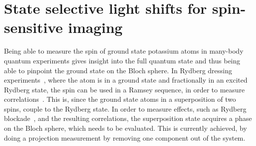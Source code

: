 \chapter{State selective light shifts for spin-sensitive imaging}%
\label{ch:spin_resolved}


Being able to measure the spin of ground state potassium atoms in many-body quantum experiments gives insight into the full quantum state and thus being able to pinpoint the ground state on the Bloch sphere. In Rydberg dressing experiments~\cite{Zeiher2016, Borish2020}, where the atom is in a ground state and fractionally in an excited Rydberg state, the spin can be used in a Ramsey sequence, in order to measure correlations~\cite{Boll2016, Zeiher2017}.
This is, since the ground state atoms in a superposition of two spins, couple to the Rydberg state. In order to measure effects, such as Rydberg blockade~\cite{Urban2009}, and the resulting correlations, the superposition state acquires a phase on the Bloch sphere, which needs to be evaluated. This is currently achieved, by doing a projection measurement by removing one component out of the system.

